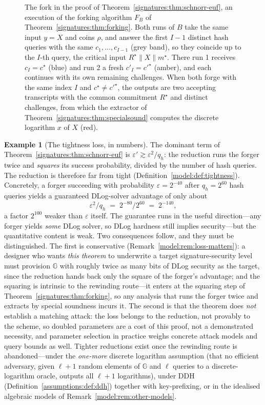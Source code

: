 \documentclass[11pt,a4paper]{article}
\theoremstyle{definition}
\newtheorem{example}[theorem]{Example}
\theoremstyle{remark}
\newcommand{\G}{\ensuremath{\mathbb{G}}}
\begin{document}
\begin{figure}[tp]
\caption{The fork in the proof of Theorem~\ref{signatures:thm:schnorr-euf}, an
execution of the forking algorithm $F_{B}$ of
Theorem~\ref{signatures:thm:forking}. Both runs of $B$ take the same input $y =
X$ and coins $\rho$, and answer the first $I - 1$ distinct hash queries with the
same $c_{1}, \dots, c_{I-1}$ (grey band), so they coincide up to the $I$-th
query, the critical input $R^{\star} \| X \| m^{\star}$. There run 1 receives
$c_{I} = c^{\star}$ (blue) and run 2 a fresh $c'_{I} = c'^{\star}$ (amber), and
each continues with its own remaining challenges. When both forge with the same
index $I$ and $c^{\star} \ne c'^{\star}$, the outputs are two accepting
transcripts with the common commitment $R^{\star}$ and distinct challenges, from
which the extractor of Theorem~\ref{signatures:thm:specialsound} computes the
discrete logarithm $x$ of $X$ (red).}
\label{fig:forking}
\end{figure}

\begin{example}[The tightness loss, in numbers]
\label{signatures:exa:tightness}
The dominant term of Theorem~\ref{signatures:thm:schnorr-euf} is
\(\varepsilon' \gtrsim \varepsilon^{2}/q_h\): the reduction runs the
forger twice and \emph{squares} its success probability, divided by
the number of hash queries. The reduction is therefore far from
tight (Definition~\ref{model:def:tightness}). Concretely, a forger
succeeding with probability \(\varepsilon = 2^{-40}\) after
\(q_h = 2^{60}\) hash queries yields a guaranteed DLog-solver
advantage of only about
\[
\varepsilon^{2}/q_h \;=\; 2^{-80}/2^{60} \;=\; 2^{-140},
\]
a factor \(2^{100}\) weaker than \(\varepsilon\) itself. The
guarantee runs in the useful direction---any forger yields
\emph{some} DLog solver, so DLog hardness still implies
security---but the quantitative content is weak. Two consequences
follow, and they must be distinguished. The first is conservative
(Remark~\ref{model:rem:loss-matters}): a designer who wants
\emph{this theorem} to underwrite a target signature-security level
must provision \(\G\) with roughly twice as many bits of DLog
security as the target, since the reduction hands back only the
square of the forger's advantage; and the squaring is intrinsic to
the rewinding route---it enters at the squaring step of
Theorem~\ref{signatures:thm:forking}, so any analysis that runs the
forger twice and extracts by special soundness incurs it. The second
is that the theorem does \emph{not} establish a matching attack: the
loss belongs to the reduction, not provably to the scheme, so doubled
parameters are a cost of this proof, not a demonstrated
necessity, and parameter selection in practice weighs concrete
attack models and query bounds as well. Tighter reductions exist
once the rewinding route is abandoned---under the \emph{one-more}
discrete logarithm assumption (that no efficient adversary, given
\(\ell + 1\) random elements of \(\G\) and \(\ell\) queries to a
discrete-logarithm oracle, outputs all \(\ell + 1\) logarithms),
under DDH (Definition~\ref{assumptions:def:ddh}) together with
key-prefixing, or in the idealised algebraic models of
Remark~\ref{model:rem:other-models}.
\end{example}
\end{document}
